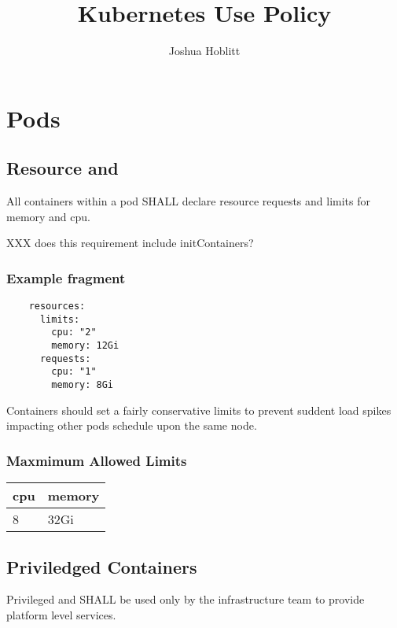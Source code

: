 \documentclass[PMO,authoryear,toc]{lsstdoc}
\title{Kubernetes Use Policy}
\author{%
Joshua Hoblitt
}
\date{\vcsDate}
\begin{document}
\maketitle

\section{Pods}\label{sec:pod}

\subsection{Resource  and }

All containers within a pod SHALL declare resource requests and limits for memory and cpu.

XXX does this requirement include initContainers?

\subsubsection{Example  fragment}

\begin{verbatim}
    resources:
      limits:
        cpu: "2"
        memory: 12Gi
      requests:
        cpu: "1"
        memory: 8Gi
\end{verbatim}

Containers should set a fairly conservative limits to prevent suddent load spikes impacting other pods schedule upon the same node.

\subsubsection{Maxmimum Allowed Limits}

\begin{center}
\begin{tabular}{|l|l|}
\hline
    \bf cpu & \bf memory \\ \hline
    8 & 32Gi \\ \hline
\end{tabular}
\end{center}

\subsection{Priviledged Containers}

Privileged  and  SHALL be used only by the infrastructure team to provide platform level services.
\end{document}

